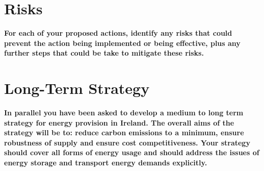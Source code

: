 \documentclass{article}
\begin{document}
    \section{Risks}
    {\scriptsize\textbf{For each of your proposed actions, identify any risks that could prevent the action being implemented or being effective, plus any further steps that could be take to mitigate these risks.}}
    \vspace{10pt}


    \section{Long-Term Strategy}
    {\scriptsize\textbf{In parallel you have been asked to develop a medium to long term strategy for energy provision in Ireland. The overall aims of the strategy will be to: reduce carbon emissions to a minimum, ensure robustness of supply and ensure cost competitiveness. Your strategy should cover all forms of energy usage and should address the issues of energy storage and transport energy demands explicitly.}}
    
\end{document}
